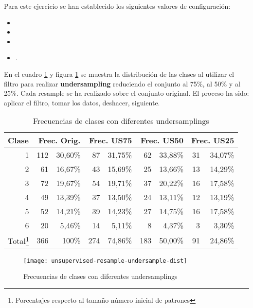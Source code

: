 Para este ejercicio se han establecido los siguientes valores de configuración:
\begin {itemize}
    \item {}
    \item {}
    \item {}
    \item {}.
\end{itemize}

En el cuadro \ref{tab:unsupervised-resample-undersample-dist} y figura \ref{fig:unsupervised-resample-undersample-dist} se muestra la distribución de las clases al utilizar el filtro para realizar \textbf{undersampling} reduciendo el conjunto al 75\%, al 50\% y al 25\%. Cada resample se ha realizado sobre el conjunto original. El proceso ha sido: aplicar el filtro, tomar los datos, deshacer, siguiente.
\begin{table}[ht]
    \centering
    \begin{tabular}{|r|rr|rr|rr|rr|}
        \hline
        \multicolumn{1}{|l|}{Clase} & \multicolumn{2}{r|}{Frec. Orig.} & \multicolumn{2}{r|}{Frec. US75} & \multicolumn{2}{r|}{Frec. US50} & \multicolumn{2}{r|}{Frec. US25} \\ 
        \hline
        1 & 112 & 30,60\% & 87 & 31,75\% & 62 & 33,88\% & 31 & 34,07\% \\
        2 & 61  & 16,67\% & 43 & 15,69\% & 25 & 13,66\% & 13 & 14,29\% \\
        3 & 72  & 19,67\% & 54 & 19,71\% & 37 & 20,22\% & 16 & 17,58\% \\
        4 & 49  & 13,39\% & 37 & 13,50\% & 24 & 13,11\% & 12 & 13,19\% \\
        5 & 52  & 14,21\% & 39 & 14,23\% & 27 & 14,75\% & 16 & 17,58\% \\
        6 & 20  & 5,46\%  & 14 & 5,11\%  & 8  & 4,37\%  & 3  & 3,30\%  \\
        \hline 
        Total\footnote{Porcentajes respecto al tamaño número inicial de patrones} & 366 & 100\% & 274 & 74,86\% & 183 & 50,00\% & 91 & 24,86\% \\
        \hline
    \end{tabular}
    \caption{Frecuencias de clases con diferentes undersamplings}
    \label{tab:unsupervised-resample-undersample-dist}
\end{table}
\begin{figure}[H]
    \centering
    \texttt{[image: unsupervised-resample-undersample-dist]}
    \caption{Frecuencias de clases con diferentes undersamplings}
    \label{fig:unsupervised-resample-undersample-dist}
\end{figure}

